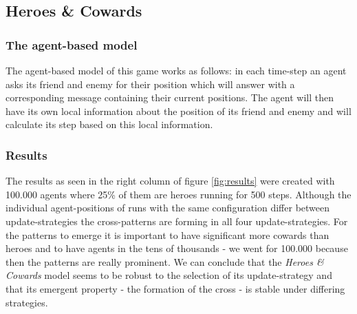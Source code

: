 \subsection{Heroes \& Cowards}
\subsubsection{The agent-based model}
The agent-based model of this game works as follows: in each time-step an agent asks its friend and enemy for their position which will answer with a corresponding message containing their current positions. The agent will then have its own local information about the position of its friend and enemy and will calculate its step based on this local information.

\subsubsection{Results}
The results as seen in the right column of figure \ref{fig:results} were created with 100.000 agents where 25\% of them are heroes running for 500 steps. Although the individual agent-positions of runs with the same configuration differ between update-strategies the cross-patterns are forming in all four update-strategies. For the patterns to emerge it is important to have significant more cowards than heroes and to have agents in the tens of thousands - we went for 100.000 because then the patterns are really prominent. We can conclude that the \textit{Heroes \& Cowards} model seems to be robust to the selection of its update-strategy and that its emergent property - the formation of the cross - is stable under differing strategies.